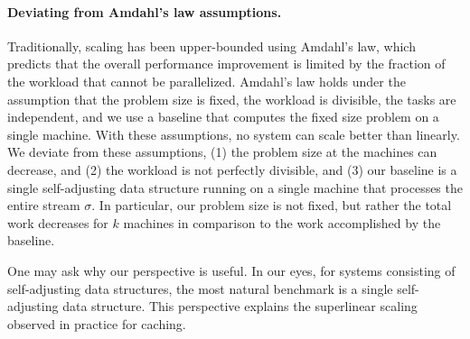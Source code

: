 
\label{sec:app:disc}
\paragraph*{Deviating from Amdahl's law assumptions.}
Traditionally, scaling has been upper-bounded using Amdahl's law, which predicts that the overall performance improvement is limited by the fraction of the workload that cannot be parallelized.
Amdahl's law holds under the assumption that the problem size is fixed, the workload is divisible, the tasks are independent, and we use a baseline that computes the fixed size problem on a single machine. With these assumptions, no system can scale better than linearly.
We deviate from these assumptions, (1) the problem size at the machines can decrease, and (2) the workload is not perfectly divisible, and (3) our baseline is a single self-adjusting data structure running on a single machine that processes the entire stream $\sigma$.
In particular, our problem size is not fixed, but rather the total work decreases for $k$ machines in comparison to the work accomplished by the baseline.

One may ask why our perspective is useful. In our eyes, for systems consisting of self-adjusting data structures, the most natural benchmark is a single self-adjusting data structure. This perspective explains the superlinear scaling observed in practice for caching.






